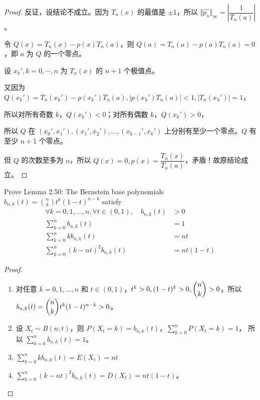 \documentclass[lang=cn,a4paper,newtx,bibend=bibtex]{elegantpaper}
\begin{document}
\begin{proof}
  反证，设结论不成立。因为 $T_n(x)$ 的最值是 $\pm 1$，所以 $\Vert \hat{p_n}\Vert_{\infty} = \left|\dfrac 1{T_n(a)}\right|$。

  令 $Q(x) = T_n(x) - p(x)T_n(a)$，则 $Q(a) = T_n(a) - p(a)T_n(a) = 0$，即 $a$ 为 $Q$ 的一个零点。
  
  设 $x_k', k = 0, \cdots, n$ 为 $T_n(x)$ 的 $n + 1$ 个极值点。

  又因为 $Q(x_k') = T_n(x_k') - p(x_k')T_n(a),|p(x_k')T_n(a)|<1,|T_n(x_k')|=1$，
  
  所以对所有奇数 $k$，$Q(x_k')<0$；对所有偶数 $k$，$Q(x_k')>0$，
  
  所以 $Q$ 在 $(x_0',x_1'),(x_1',x_2'),\dots,(x_{k-1}',x_k')$ 上分别有至少一个零点。$Q$ 有至少 $n+1$ 个零点。
  
  但 $Q$ 的次数至多为 $n$，所以 $Q(x)=0,p(x)=\dfrac{T_n(x)}{T_n(a)}$，矛盾！故原结论成立。
\end{proof}


\begin{prob}[2.9.1-\textrm{XI}.]
    Prove Lemma 2.50: The Bernstein base polynomials $b_{n,k}(t) = \binom{n}{k}t^k(1-t)^{n-k}$ satisfy
    \begin{align*}
      \forall k=0,1,\ldots,n, \forall t\in(0,1),\quad b_{n,k}(t)&>0 \\
      \sum_{k=0}^n b_{n,k}(t)&=1\\
      \sum_{k=0}^n kb_{n,k}(t) &= nt\\
      \sum_{k=0}^n (k-nt)^2b_{n,k}(t)&=nt(1-t)
    \end{align*}
\end{prob}

\begin{proof}
  ~~\\
\begin{enumerate}
\item 对任意 $k=0,1,\dots,n$ 和 $t\in (0,1)$，$t^k>0,(1-t)^k>0,\dbinom nk>0$，所以 $b_{n,k}(t)=\dbinom nk t^k(1-t)^{n-k}>0$。

\item  设 $X_t\sim B(n;t)$，则 $P(X_t=k)=b_{n,k}(t)$，$\sum_{k=0}^n P(X_t=k) = 1$， 所以 $\sum_{k = 0}^n b_{n,k}(t) = 1$。

\item $\sum_{k=0}^n kb_{n,k}(t) = E(X_t) = nt$

\item $\sum_{k=0}^n (k-nt)^2b_{n,k}(t) = D(X_t) = nt(1-t)$。
\end{enumerate}
\end{proof}
\end{document}

